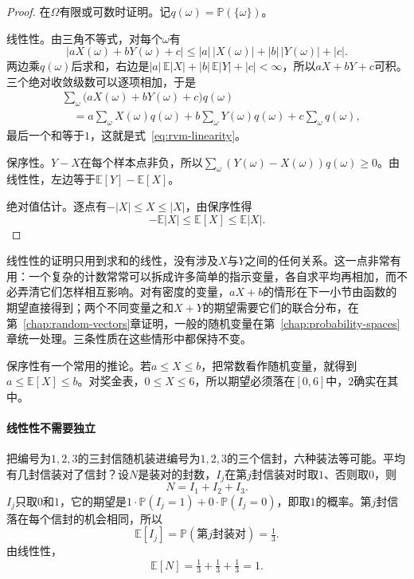 \begin{proof}
在$\Omega$有限或可数时证明。记$q(\omega)=\mathbb{P}(\{\omega\})$。

线性性。由三角不等式，对每个$\omega$有
\[
 \lvert aX(\omega)+bY(\omega)+c\rvert\leq\lvert a\rvert\,\lvert X(\omega)\rvert+\lvert b\rvert\,\lvert Y(\omega)\rvert+\lvert c\rvert .
\]
两边乘$q(\omega)$后求和，右边是$\lvert a\rvert\,\mathbb{E}\lvert X\rvert+\lvert b\rvert\,\mathbb{E}\lvert Y\rvert+\lvert c\rvert<\infty$，所以$aX+bY+c$可积。三个绝对收敛级数可以逐项相加，于是
\[
 \begin{aligned}
 &\sum_{\omega}\bigl(aX(\omega)+bY(\omega)+c\bigr)q(\omega)\\
 &\quad=a\sum_{\omega}X(\omega)q(\omega)+b\sum_{\omega}Y(\omega)q(\omega)+c\sum_{\omega}q(\omega),
 \end{aligned}
\]
最后一个和等于$1$，这就是式~\eqref{eq:rvm-linearity}。

保序性。$Y-X$在每个样本点非负，所以$\sum_{\omega}(Y(\omega)-X(\omega))q(\omega)\geq0$。由线性性，左边等于$\mathbb{E}[Y]-\mathbb{E}[X]$。

绝对值估计。逐点有$-\lvert X\rvert\leq X\leq\lvert X\rvert$，由保序性得
\[
 -\mathbb{E}\lvert X\rvert\leq\mathbb{E}[X]\leq\mathbb{E}\lvert X\rvert .
\]
\end{proof}

线性性的证明只用到求和的线性，没有涉及$X$与$Y$之间的任何关系。这一点非常有用：一个复杂的计数常常可以拆成许多简单的指示变量，各自求平均再相加，而不必弄清它们怎样相互影响。对有密度的变量，$aX+b$的情形在下一小节由函数的期望直接得到；两个不同变量之和$X+Y$的期望需要它们的联合分布，在第~\ref{chap:random-vectors}章证明，一般的随机变量在第~\ref{chap:probability-spaces}章统一处理。三条性质在这些情形中都保持不变。

保序性有一个常用的推论。若$a\leq X\leq b$，把常数看作随机变量，就得到$a\leq\mathbb{E}[X]\leq b$。对奖金表，$0\leq X\leq6$，所以期望必须落在$[0,6]$中，$2$确实在其中。

\paragraph{线性性不需要独立}
把编号为$1,2,3$的三封信随机装进编号为$1,2,3$的三个信封，六种装法等可能。平均有几封信装对了信封？设$N$是装对的封数，$I_j$在第$j$封信装对时取$1$、否则取$0$，则
\[
 N=I_1+I_2+I_3 .
\]
$I_j$只取$0$和$1$，它的期望是$1\cdot\mathbb{P}(I_j=1)+0\cdot\mathbb{P}(I_j=0)$，即取$1$的概率。第$j$封信落在每个信封的机会相同，所以
\[
 \mathbb{E}[I_j]=\mathbb{P}(\text{第}j\text{封装对})=\tfrac13 .
\]
由线性性，
\[
 \mathbb{E}[N]=\tfrac13+\tfrac13+\tfrac13=1 .
\]

